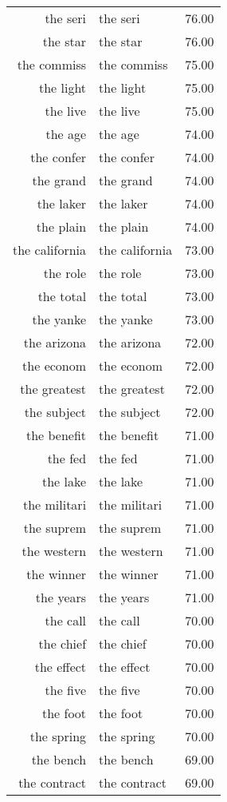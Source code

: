 \begin{table}[ht]
\begin{tabular}{rlr}
  the seri & the seri & 76.00 \\ 
  the star & the star & 76.00 \\ 
  the commiss & the commiss & 75.00 \\ 
  the light & the light & 75.00 \\ 
  the live & the live & 75.00 \\ 
  the age & the age & 74.00 \\ 
  the confer & the confer & 74.00 \\ 
  the grand & the grand & 74.00 \\ 
  the laker & the laker & 74.00 \\ 
  the plain & the plain & 74.00 \\ 
  the california & the california & 73.00 \\ 
  the role & the role & 73.00 \\ 
  the total & the total & 73.00 \\ 
  the yanke & the yanke & 73.00 \\ 
  the arizona & the arizona & 72.00 \\ 
  the econom & the econom & 72.00 \\ 
  the greatest & the greatest & 72.00 \\ 
  the subject & the subject & 72.00 \\ 
  the benefit & the benefit & 71.00 \\ 
  the fed & the fed & 71.00 \\ 
  the lake & the lake & 71.00 \\ 
  the militari & the militari & 71.00 \\ 
  the suprem & the suprem & 71.00 \\ 
  the western & the western & 71.00 \\ 
  the winner & the winner & 71.00 \\ 
  the years & the years & 71.00 \\ 
  the call & the call & 70.00 \\ 
  the chief & the chief & 70.00 \\ 
  the effect & the effect & 70.00 \\ 
  the five & the five & 70.00 \\ 
  the foot & the foot & 70.00 \\ 
  the spring & the spring & 70.00 \\ 
  the bench & the bench & 69.00 \\ 
  the contract & the contract & 69.00 \\ 

\end{tabular}
\end{table}
